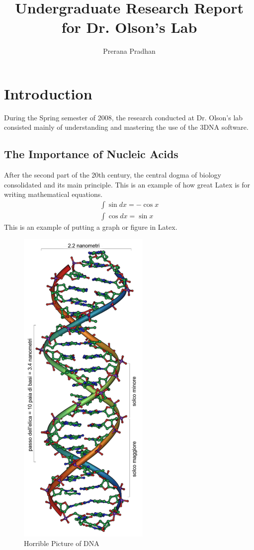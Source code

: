 \documentclass[pdftex]{article}
\begin{document}
\author{Prerana Pradhan}
\title{Undergraduate Research Report for Dr. Olson's Lab}
\maketitle
\section{Introduction}
During the Spring semester of 2008, the research conducted at Dr. Olson's lab consisted mainly of understanding and mastering the use of the 3DNA software. 
\subsection{The Importance of Nucleic Acids}
After the second part of the 20th century, the central dogma of biology consolidated and its main principle. 
\newline
\noindent
This is an example of how great Latex is for writing mathematical equations. 
\begin{gather}
\int \sin dx = - \cos x \\
\int \cos dx = \sin x  
\end{gather}
This is an example of putting a graph or figure in Latex.
\begin{figure}
\centering
\includegraphics[scale=0.5]{dna.png}
\caption{Horrible Picture of DNA}
\end{figure}
\end{document}
